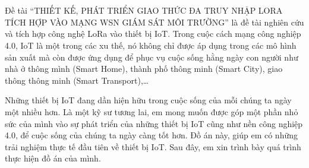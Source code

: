 \chapter*{\centering \large{}}
Đề tài “THIẾT KẾ, PHÁT TRIỂN GIAO THỨC ĐA TRUY NHẬP LORA TÍCH HỢP VÀO MẠNG WSN GIÁM SÁT MÔI TRƯỜNG” là đề tài nghiên cứu và tích hợp công nghệ LoRa vào thiết bị IoT. Trong cuộc cách mạng công nghiệp 4.0, IoT là một trong các xu thế, nó không chỉ được áp dụng trong các mô hình sản xuất mà còn được ứng dụng để phục vụ cuộc sống hằng ngày con người như nhà ở thông mình (Smart Home), thành phố thông minh (Smart City), giao thông thông minh (Smart Transport),…
\par
Những thiết bị IoT đang dần hiện hữu trong cuộc sống của mỗi chúng ta ngày một nhiều hơn. Là một kỹ sư tương lai, em mong muốn được góp một phần nhỏ sức của mình vào sự phát triển của những thiết bị IoT cũng như nền công nghiệp 4.0, để cuộc sống của chúng ta ngày càng tốt hơn. Đồ án này, giúp em có những trải nghiệm thực tế đầu tiên về thiết bị IoT. Sau đây, em xin trình bày quá trình thực hiện đồ án của mình.



